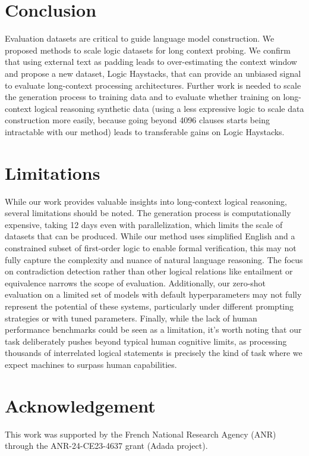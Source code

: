 \documentclass[11pt]{article}
\begin{document}
\section{Conclusion}
Evaluation datasets are critical to guide language model construction. We proposed methods to scale logic datasets for long context probing. We confirm that using external text as padding leads to over-estimating the context window and propose a new dataset, Logic Haystacks, that can provide an unbiased signal to evaluate long-context processing architectures. Further work is needed to scale the generation process to training data and to evaluate whether training on long-context logical reasoning synthetic data (using a less expressive logic to scale data construction more easily, because going beyond 4096 clauses starts being intractable with our method) leads to transferable gains on Logic Haystacks.

\section*{Limitations}
While our work provides valuable insights into long-context logical reasoning, several limitations should be noted. The generation process is computationally expensive, taking 12 days even with parallelization, which limits the scale of datasets that can be produced. While our method uses simplified English and a constrained subset of first-order logic to enable formal verification, this may not fully capture the complexity and nuance of natural language reasoning. The focus on contradiction detection rather than other logical relations like entailment or equivalence narrows the scope of evaluation. Additionally, our zero-shot evaluation on a limited set of models with default hyperparameters may not fully represent the potential of these systems, particularly under different prompting strategies or with tuned parameters. Finally, while the lack of human performance benchmarks could be seen as a limitation, it's worth noting that our task deliberately pushes beyond typical human cognitive limits, as processing thousands of interrelated logical statements is precisely the kind of task where we expect machines to surpass human capabilities.

\ifdefined\acl@finalcopy
\section*{Acknowledgement}
This work was supported by the French National Research Agency (ANR) through the ANR-24-CE23-4637 grant (Adada project).
\end{document}
